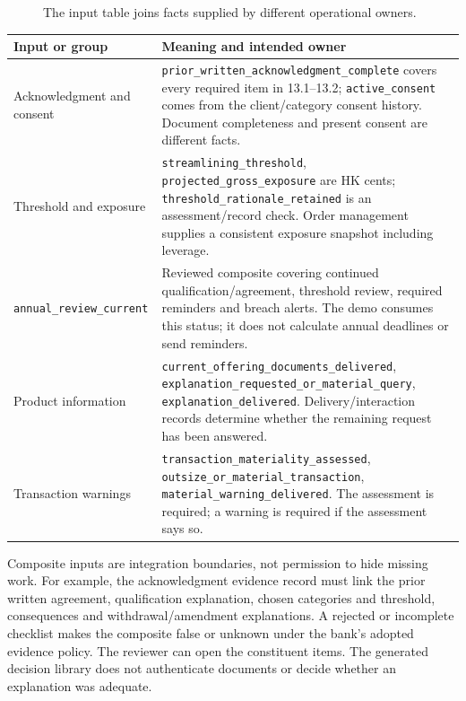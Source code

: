 \begingroup\normalsize
\begin{figure}[H]
\centering
{}
\caption{The input table joins facts supplied by different operational owners.}\label{fig:gap-spi-inputs}
\end{figure}

\endgroup
\begin{longtable}{P{0.30\textwidth}P{0.60\textwidth}}

\toprule Input or group & Meaning and intended owner \\\midrule
\endhead
Acknowledgment and consent & \texttt{prior\_written\_acknowledgment\_complete} covers every required item in 13.1--13.2; \texttt{active\_consent} comes from the client/category consent history. Document completeness and present consent are different facts.\\
Threshold and exposure & \texttt{streamlining\_threshold}, \texttt{projected\_gross\_exposure} are HK cents; \texttt{threshold\_rationale\_retained} is an assessment/record check. Order management supplies a consistent exposure snapshot including leverage.\\
\texttt{annual\_review\_current} & Reviewed composite covering continued qualification/agreement, threshold review, required reminders and breach alerts. The demo consumes this status; it does not calculate annual deadlines or send reminders.\\
Product information & \texttt{current\_offering\_documents\_delivered}, \texttt{explanation\_requested\_or\_material\_query}, \texttt{explanation\_delivered}. Delivery/interaction records determine whether the remaining request has been answered.\\
Transaction warnings & \texttt{transaction\_materiality\_assessed}, \texttt{outsize\_or\_material\_transaction}, \texttt{material\_warning\_delivered}. The assessment is required; a warning is required if the assessment says so.\\
\bottomrule
\end{longtable}
\endgroup

Composite inputs are integration boundaries, not permission to hide missing
work. For example, the acknowledgment evidence record must link the prior
written agreement, qualification explanation, chosen categories and threshold,
consequences and withdrawal/amendment explanations. A rejected or incomplete
checklist makes the composite false or unknown under the bank's adopted evidence
policy. The reviewer can open the constituent items. The generated decision
library does not authenticate documents or decide whether an explanation was
adequate.

